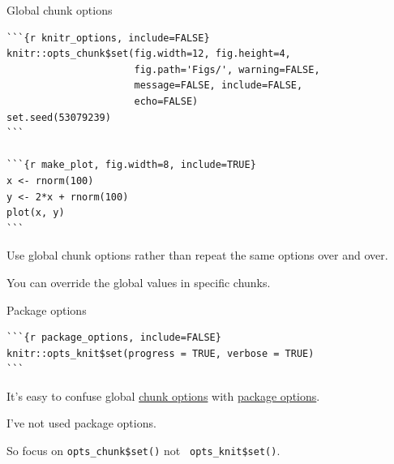 \documentclass[12pt,t]{beamer}
\begin{document}
\begin{frame}[fragile]{Global chunk options}

\vspace{6pt}

\begin{lstlisting}
```{r knitr_options, include=FALSE}
knitr::opts_chunk$set(fig.width=12, fig.height=4,
                      fig.path='Figs/', warning=FALSE,
                      message=FALSE, include=FALSE,
                      echo=FALSE)
set.seed(53079239)
```

```{r make_plot, fig.width=8, include=TRUE}
x <- rnorm(100)
y <- 2*x + rnorm(100)
plot(x, y)
```
\end{lstlisting}

\vfill

\bi
\itemsep12pt
\item Use global chunk options rather than repeat the same options over and over.
\item You can override the global values in specific chunks.
\ei

\end{frame}





\begin{frame}[fragile]{Package options}

\vspace{24pt}

\begin{lstlisting}
```{r package_options, include=FALSE}
knitr::opts_knit$set(progress = TRUE, verbose = TRUE)
```
\end{lstlisting}

\vfill
\bi
\itemsep12pt
\item It's easy to confuse global \href{http://yihui.name/knitr/options#chunk_options}{chunk options} with
\href{http://yihui.name/knitr/options#package_options}{package options}.
\item I've not used package options.
\item So focus on {\tt \hilit opts\_chunk\$set()} not {\tt
  \lolit opts\_knit\$set()}.
\ei

\end{frame}
\end{document}

